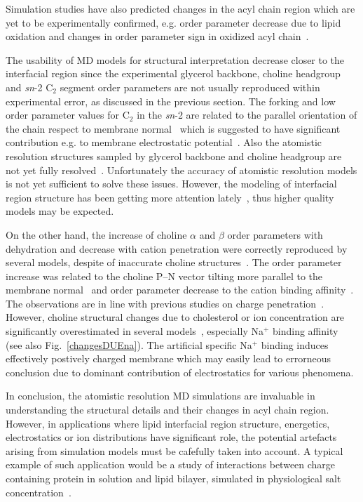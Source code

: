 \documentclass[aps,prl,superscriptaddress,twocolumn]{revtex4}
\begin{document}
Simulation studies have also predicted changes in the acyl chain region which are yet to be experimentally 
confirmed, e.g. order parameter decrease due to lipid oxidation and changes in order parameter sign in oxidized 
acyl chain~\cite{ekkabut07}. %

The usability of MD models for structural interpretation decrease closer to the interfacial region since the
experimental glycerol backbone, choline headgroup and {\it sn}-2 C$_2$ segment order parameters are 
not usually reproduced within experimental error, as discussed in the previous section. 
The forking and low order parameter values for C$_2$ in the {\it sn}-2 are related
to the parallel orientation of the chain respect to membrane normal~\cite{schindler75,seelig75}
which is suggested to have significant contribution e.g. to membrane electrostatic potential~\cite{gawrisch92}.
Also the atomistic resolution structures sampled by glycerol backbone and choline headgroup are not yet fully 
resolved~\cite{gally75,seelig77,strenk85,akutsu91,bruzik97,Semchyschyn04}.
Unfortunately the accuracy of atomistic resolution models is not yet sufficient to solve these issues.
However, the modeling of interfacial region structure has been getting more attention lately~\cite{klauda10,prakash10,dickson12,chowdhary13,botan15}, 
thus higher quality models may be expected.  

On the other hand, the increase of choline $\alpha$ and $\beta$ order parameters with dehydration 
and decrease with cation penetration were correctly reproduced by several models, 
despite of inaccurate choline structures~\cite{botan15,ionpaper}. The order parameter increase
was related to the choline P--N vector tilting more parallel to the membrane normal~\cite{botan15}
and order parameter decrease to the cation binding affinity~\cite{ionpaper}. 
The observations are in line with previous studies on charge penetration~\cite{akutsu81,altenbach84,seelig87,scherer89}.
However, choline structural changes due to cholesterol or ion concentration are significantly overestimated
in several models~\cite{ferreira13,botan15,ionpaper,madej15}, especially Na$^{+}$ binding affinity~\cite{ionpaper} (see also Fig.~\ref{changesDUEna}). 
The artificial specific Na$^{+}$  binding induces effectively postively charged membrane which may easily
lead to errorneous conclusion due to dominant contribution of electrostatics for various phenomena.

In conclusion, the atomistic resolution MD simulations are invaluable in understanding the 
structural details and their changes in acyl chain region. However, in applications where 
lipid interfacial region structure, energetics, electrostatics or ion distributions have significant role,
the potential artefacts arising from simulation models must be cafefully taken into account.
A typical example of such application would be a study of interactions between charge containing protein in solution
and lipid bilayer, simulated in physiological salt concentration~\cite{arkhipov13,kaszuba15}.
\end{document}
